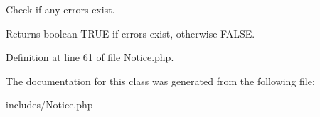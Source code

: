 Check if any errors exist. 

\begin{DoxyReturn}{Returns}
boolean T\-R\-U\-E if errors exist, otherwise F\-A\-L\-S\-E. 
\end{DoxyReturn}


Definition at line \hyperlink{Notice_8php_source_l00061}{61} of file \hyperlink{Notice_8php_source}{Notice.\-php}.



The documentation for this class was generated from the following file\-:\begin{DoxyCompactItemize}
\item 
includes/Notice.\-php\end{DoxyCompactItemize}
